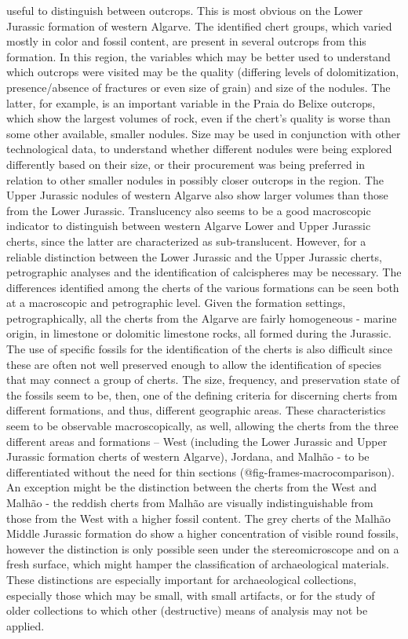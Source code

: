 \documentclass[
  a4paper,
  DIV=11,
  numbers=noendperiod]{scrreprt}
\begin{document}
useful to distinguish between outcrops. This is most obvious on the
Lower Jurassic formation of western Algarve. The identified chert
groups, which varied mostly in color and fossil content, are present in
several outcrops from this formation. In this region, the variables
which may be better used to understand which outcrops were visited may
be the quality (differing levels of dolomitization, presence/absence of
fractures or even size of grain) and size of the nodules. The latter,
for example, is an important variable in the Praia do Belixe outcrops,
which show the largest volumes of rock, even if the chert's quality is
worse than some other available, smaller nodules. Size may be used in
conjunction with other technological data, to understand whether
different nodules were being explored differently based on their size,
or their procurement was being preferred in relation to other smaller
nodules in possibly closer outcrops in the region. The Upper Jurassic
nodules of western Algarve also show larger volumes than those from the
Lower Jurassic. Translucency also seems to be a good macroscopic
indicator to distinguish between western Algarve Lower and Upper
Jurassic cherts, since the latter are characterized as sub-translucent.
However, for a reliable distinction between the Lower Jurassic and the
Upper Jurassic cherts, petrographic analyses and the identification of
calcispheres may be necessary. The differences identified among the
cherts of the various formations can be seen both at a macroscopic and
petrographic level. Given the formation settings, petrographically, all
the cherts from the Algarve are fairly homogeneous - marine origin, in
limestone or dolomitic limestone rocks, all formed during the Jurassic.
The use of specific fossils for the identification of the cherts is also
difficult since these are often not well preserved enough to allow the
identification of species that may connect a group of cherts. The size,
frequency, and preservation state of the fossils seem to be, then, one
of the defining criteria for discerning cherts from different
formations, and thus, different geographic areas. These characteristics
seem to be observable macroscopically, as well, allowing the cherts from
the three different areas and formations -- West (including the Lower
Jurassic and Upper Jurassic formation cherts of western Algarve),
Jordana, and Malhão - to be differentiated without the need for thin
sections (@fig-frames-macrocomparison). An exception might be the
distinction between the cherts from the West and Malhão - the reddish
cherts from Malhão are visually indistinguishable from those from the
West with a higher fossil content. The grey cherts of the Malhão Middle
Jurassic formation do show a higher concentration of visible round
fossils, however the distinction is only possible seen under the
stereomicroscope and on a fresh surface, which might hamper the
classification of archaeological materials. These distinctions are
especially important for archaeological collections, especially those
which may be small, with small artifacts, or for the study of older
collections to which other (destructive) means of analysis may not be
applied.
\end{document}
